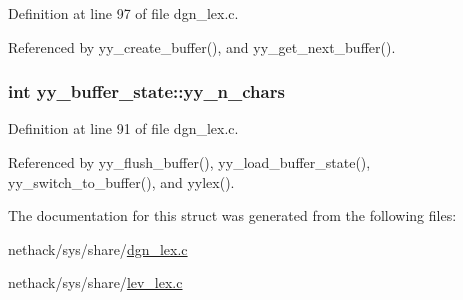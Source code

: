 Definition at line 97 of file dgn\+\_\+lex.\+c.



Referenced by yy\+\_\+create\+\_\+buffer(), and yy\+\_\+get\+\_\+next\+\_\+buffer().

\hypertarget{structyy__buffer__state_a06406208824817acfec2183b79080945}{
\subsubsection[{yy\+\_\+n\+\_\+chars}]{\setlength{\rightskip}{0pt plus 5cm}int yy\+\_\+buffer\+\_\+state\+::yy\+\_\+n\+\_\+chars}}\label{structyy__buffer__state_a06406208824817acfec2183b79080945}


Definition at line 91 of file dgn\+\_\+lex.\+c.



Referenced by yy\+\_\+flush\+\_\+buffer(), yy\+\_\+load\+\_\+buffer\+\_\+state(), yy\+\_\+switch\+\_\+to\+\_\+buffer(), and yylex().



The documentation for this struct was generated from the following files\+:\begin{DoxyCompactItemize}
\item 
nethack/sys/share/\hyperlink{dgn__lex_8c}{dgn\+\_\+lex.\+c}\item 
nethack/sys/share/\hyperlink{lev__lex_8c}{lev\+\_\+lex.\+c}\end{DoxyCompactItemize}
